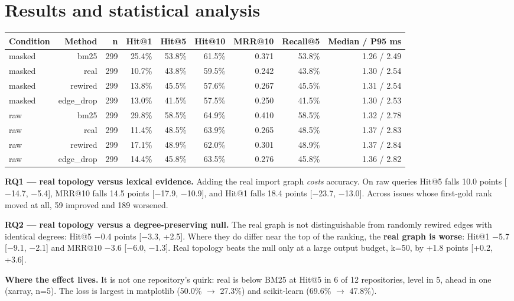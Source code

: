 \documentclass[10pt,a4paper]{article}
\begin{document}
\section{Results and statistical analysis}
\begin{center}\footnotesize\begin{tabular}{lrrrrrrrr}
\toprule
Condition & Method & n & Hit@1 & Hit@5 & Hit@10 & MRR@10 & Recall@5 & Median / P95 ms \\
\midrule
masked & bm25 & 299 & 25.4\% & 53.8\% & 61.5\% & 0.371 & 53.8\% & 1.26 / 2.49 \\
masked & real & 299 & 10.7\% & 43.8\% & 59.5\% & 0.242 & 43.8\% & 1.30 / 2.54 \\
masked & rewired & 299 & 13.8\% & 45.5\% & 57.6\% & 0.267 & 45.5\% & 1.31 / 2.54 \\
masked & edge\_drop & 299 & 13.0\% & 41.5\% & 57.5\% & 0.250 & 41.5\% & 1.30 / 2.53 \\
raw & bm25 & 299 & 29.8\% & 58.5\% & 64.9\% & 0.410 & 58.5\% & 1.32 / 2.78 \\
raw & real & 299 & 11.4\% & 48.5\% & 63.9\% & 0.265 & 48.5\% & 1.37 / 2.83 \\
raw & rewired & 299 & 17.1\% & 48.9\% & 62.0\% & 0.301 & 48.9\% & 1.37 / 2.84 \\
raw & edge\_drop & 299 & 14.4\% & 45.8\% & 63.5\% & 0.276 & 45.8\% & 1.36 / 2.82 \\
\bottomrule
\end{tabular}\end{center}

\textbf{RQ1 --- real topology versus lexical evidence.} Adding the real import graph \textit{costs} accuracy. On raw queries Hit@5 falls 10.0 points [$-$14.7, $-$5.4], MRR@10 falls 14.5 points [$-$17.9, $-$10.9], and Hit@1 falls 18.4 points [$-$23.7, $-$13.0]. Across issues whose first-gold rank moved at all, 59 improved and 189 worsened.

\textbf{RQ2 --- real topology versus a degree-preserving null.} The real graph is not distinguishable from randomly rewired edges with identical degrees: Hit@5 $-$0.4 points [$-$3.3, +2.5]. Where they do differ near the top of the ranking, the \textbf{real graph is worse}: Hit@1 $-$5.7 [$-$9.1, $-$2.1] and MRR@10 $-$3.6 [$-$6.0, $-$1.3]. Real topology beats the null only at a large output budget, k=50, by +1.8 points [+0.2, +3.6].

\textbf{Where the effect lives.} It is not one repository's quirk: real is below BM25 at Hit@5 in 6 of 12 repositories, level in 5, ahead in one (xarray, n=5). The loss is largest in matplotlib (50.0\% $\rightarrow$ 27.3\%) and scikit-learn (69.6\% $\rightarrow$ 47.8\%).
\end{document}
